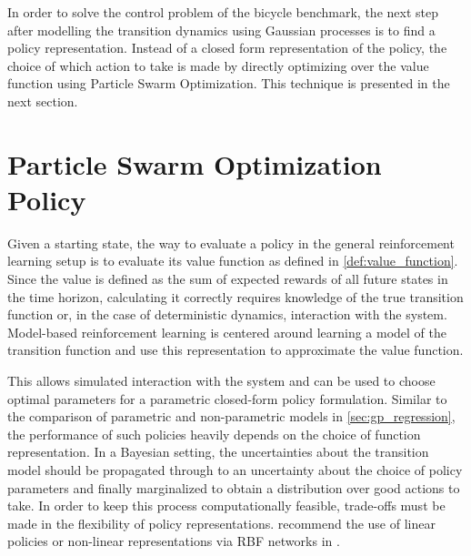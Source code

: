 In order to solve the control problem of the bicycle benchmark, the next step after modelling the transition dynamics using Gaussian processes is to find a policy representation.
Instead of a closed form representation of the policy, the choice of which action to take is made by directly optimizing over the value function using Particle Swarm Optimization.
This technique is presented in the next section.

\section{Particle Swarm Optimization Policy}
Given a starting state, the way to evaluate a policy in the general reinforcement learning setup is to evaluate its value function as defined in \cref{def:value_function}.
Since the value is defined as the sum of expected rewards of all future states in the time horizon, calculating it correctly requires knowledge of the true transition function or, in the case of deterministic dynamics, interaction with the system.
Model-based reinforcement learning is centered around learning a model of the transition function and use this representation to approximate the value function.

This allows simulated interaction with the system and can be used to choose optimal parameters for a parametric closed-form policy formulation.
Similar to the comparison of parametric and non-parametric models in \cref{sec:gp_regression}, the performance of such policies heavily depends on the choice of function representation.
In a Bayesian setting, the uncertainties about the transition model should be propagated through to an uncertainty about the choice of policy parameters and finally marginalized to obtain a distribution over good actions to take.
In order to keep this process computationally feasible, trade-offs must be made in the flexibility of policy representations.
\citeauthor{deisenroth_pilco:_2011} recommend the use of linear policies or non-linear representations via RBF networks in \cite{deisenroth_pilco:_2011}.


